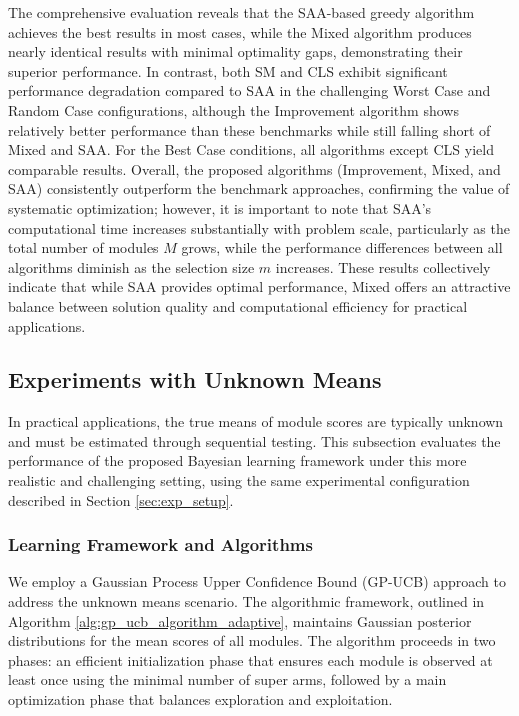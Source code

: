 \documentclass[opre,sglanonrev]{informs4}
\begin{document}
The comprehensive evaluation reveals that the SAA-based greedy algorithm achieves the best results in most cases, while the Mixed algorithm produces nearly identical results with minimal optimality gaps, demonstrating their superior performance. In contrast, both SM and CLS exhibit significant performance degradation compared to SAA in the challenging Worst Case and Random Case configurations, although the Improvement algorithm shows relatively better performance than these benchmarks while still falling short of Mixed and SAA. For the Best Case conditions, all algorithms except CLS yield comparable results. Overall, the proposed algorithms (Improvement, Mixed, and SAA) consistently outperform the benchmark approaches, confirming the value of systematic optimization; however, it is important to note that SAA's computational time increases substantially with problem scale, particularly as the total number of modules $M$ grows, while the performance differences between all algorithms diminish as the selection size $m$ increases. These results collectively indicate that while SAA provides optimal performance, Mixed offers an attractive balance between solution quality and computational efficiency for practical applications.

\subsection{Experiments with Unknown Means}
\label{sec:unknown_means}

In practical applications, the true means of module scores are typically unknown and must be estimated through sequential testing. This subsection evaluates the performance of the proposed Bayesian learning framework under this more realistic and challenging setting, using the same experimental configuration described in Section \ref{sec:exp_setup}.

\subsubsection{Learning Framework and Algorithms}

We employ a Gaussian Process Upper Confidence Bound (GP-UCB) approach to address the unknown means scenario. The algorithmic framework, outlined in Algorithm \ref{alg:gp_ucb_algorithm_adaptive}, maintains Gaussian posterior distributions for the mean scores of all modules. The algorithm proceeds in two phases: an efficient initialization phase that ensures each module is observed at least once using the minimal number of super arms, followed by a main optimization phase that balances exploration and exploitation.
\end{document}
